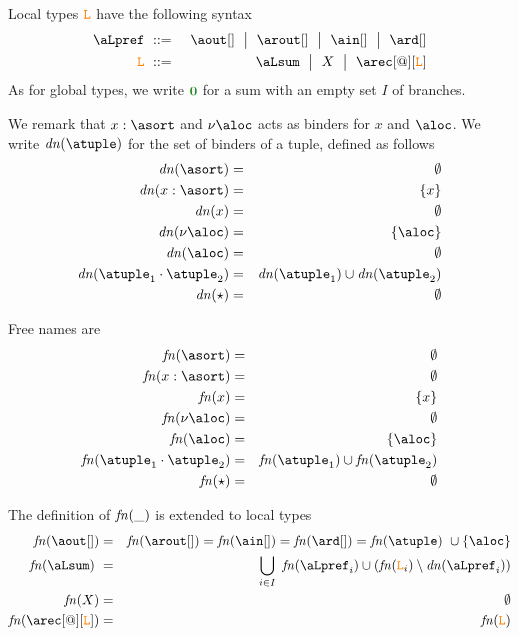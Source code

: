 %

Local types $\texttt{\textcolor{orange}L}$ have the following syntax
\begin{eqnarray*}
  \aLpref & \bnfdef &
                  \aout[] \bnfmid
                  \arout[]\bnfmid
                  \ain[] \bnfmid
                  \ard[] 
\\
  \aL & \bnfdef &
                  \aLsum \bnfmid
                  X \bnfmid
                  \arec[@][\aL]
\end{eqnarray*}
As for global types, we write $\nil$ for a sum with an empty set $I$ of branches. 

We remark that  $x : \asort$ and $\nu \aloc$ acts as binders for $x$ and $\aloc$. 
We write $\dn\atuple$ for the set of binders of a tuple, defined as follows
\begin{eqnarray*}
  \dn\asort & = & \emptyset
  \\
  \dn{x : \asort} & = & \{x\}
  \\
  \dn{x} & = & \emptyset
  \\
  \dn{\nu \aloc} & = & \{\aloc\}
  \\
  \dn{\aloc} & = & \emptyset
  \\
  \dn{\atuple_1 \cdot \atuple_2} & = & \dn{\atuple_1} \cup \dn{\atuple_2}
  \\
  \dn{\wildcard} & = & \emptyset
\end{eqnarray*}

Free names are 
\begin{eqnarray*}
  \fn\asort & = & \emptyset
  \\
  \fn{x : \asort} & = & \emptyset
  \\
  \fn{x} & = &  \{x\}
  \\
  \fn{\nu \aloc} & = & \emptyset
  \\
  \fn{\aloc} & = & \{\aloc\}
  \\
  \fn{\atuple_1 \cdot \atuple_2} & = & \fn{\atuple_1} \cup \fn{\atuple_2}
  \\
  \fn{\wildcard} & = & \emptyset
\end{eqnarray*}

The definition of ${\it fn}(\_)$ is extended to local types 
\begin{eqnarray*}
  \fn {\aout[]}  & = & \fn {\arout[]} = \fn {\ain[]} = \fn {\ard[]} = \fn {\atuple} \cup \{\aloc\}  
  \\
  \fn {\aLsum} & = & \bigcup_{i\in I} \fn{\aLpref_i}\cup (\fn {\aL_i}\setminus \dn{\aLpref_i}) 
  \\
  \fn {X} & = & \emptyset 
  \\
  \fn {\arec[@][\aL]} & = & \fn {\aL} 
\end{eqnarray*}

